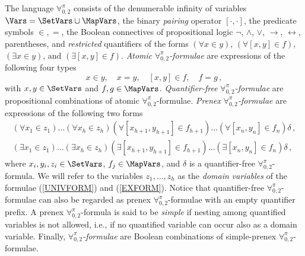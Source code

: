 \documentclass[submission,copyright,creativecommons]{eptcs}
\newcommand{\Lang}{\ensuremath{\mathbf{\forall}^{\pi}_{0,2}}\xspace}
\newcommand{\svx}{x}
\newcommand{\svy}{y}
\newcommand{\svz}{z}
\newcommand{\mvx}{f}
\newcommand{\mvy}{g}
\begin{document}
The language \Lang consists of the denumerable infinity of variables
$\Vars = \SetVars \cup \MapVars$, the binary \emph{pairing} operator
$[\cdot,\cdot]$, the predicate symbols $\in, =$, the Boolean
connectives of propositional logic $\neg$, $\wedge$, $\vee$,
$\rightarrow$, $\leftrightarrow$, parentheses, and \emph{restricted}
quantifiers of the forms $(\forall x \in y)$, $(\forall [x,y] \in f)$,
$(\exists x \in y)$, and $(\exists [x,y] \in f)$.
\emph{Atomic} \Lang\emph{-formulae} are expressions of
the following four types
\begin{equation}
    \label{atomic}
\svx \in \svy, \quad \svx=\svy, \quad  [\svx,\svy] \in \mvx, \quad \mvx=\mvy \,,
\end{equation}
with $\svx,\svy \in \SetVars$ and $\mvx, \mvy \in \MapVars$.
\emph{Quantifier-free} \Lang\emph{-formulae} are propositional
combinations of atomic \Lang-formulae. 
\emph{Prenex} \Lang\emph{-formulae} are expressions of the 
following two forms
\begin{gather}
(\forall \svx_1 \in \svz_1) \ldots (\forall \svx_h \in \svz_h)(\forall
 [\svx_{h+1}, \svy_{h+1}] \in \mvx_{h+1})\ldots(\forall [\svx_n, \svy_n] \in
 \mvx_n)\delta\,,  \label{UNIVFORM} \\
(\exists \svx_1 \in \svz_1) \ldots (\exists \svx_h \in \svz_h)(\exists
 [\svx_{h+1}, \svy_{h+1}] \in \mvx_{h+1})\ldots(\exists [\svx_n, \svy_n] \in
 \mvx_n)\delta\,, \label{EXFORM}
\end{gather}
where $\svx_i, \svy_i, \svz_i \in \SetVars$, $\mvx_j \in \MapVars$,
and $\delta$ is a quantifier-free \Lang-formula.  We will refer to the
variables $\svz_1, \ldots, \svz_h$ as the \emph{domain variables} of
the formulae (\ref{UNIVFORM}) and (\ref{EXFORM}).  Notice that
quantifier-free \Lang-formulae can also be regarded as prenex
\Lang-formulae with an empty quantifier prefix.
A prenex \Lang-formula is said to be \emph{simple} if nesting among
quantified variables is not allowed, i.e., if no quantified variable
can occur also as a domain variable.
Finally, \Lang\emph{-formulae} are Boolean combinations of
simple-prenex \Lang-formulae.
\end{document}
